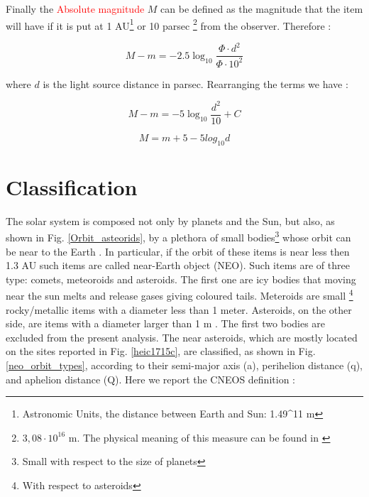 \documentclass[12pt,%
               a4paper,%
               oneside,openany,%
               titlepage,%
               headinclude,footinclude,%
               BCOR5mm,%
               cleardoublepage=empty,%
               tablecaptionabove,%
               floatperchapter,
               ]{scrreprt}                 %
\begin{document}
Finally the \textcolor{red}{Absolute magnitude} $M$ can be defined as the magnitude that the item will have if it is put at 1 AU\footnote{Astronomic Units, the distance between Earth and Sun: 1.49^{11} m} or 10 parsec \footnote{$3,08\cdot 10^{16}$ m. The physical meaning of this measure can be found in \cite{burbine2016asteroids}} from the observer. Therefore  \cite{burbine2016asteroids}:

\begin{equation}
M-m=-2.5\log_{10}\frac{\Phi\cdot d^{2} }{\Phi\cdot 10^{2}}
\end{equation}

where $d$ is the light source distance in parsec. Rearranging the terms we have \cite{burbine2016asteroids}:

\begin{equation}
M-m=-5\log_{10}\frac{ d^{2} }{10}+C
\end{equation}

\begin{equation}
M=m+5-5log_{10}d
\end{equation}



\section{Classification}

The solar system is composed not only by planets and the Sun, but also, as shown in Fig. \ref{Orbit_asteorids}, by a plethora of small bodies\footnote{Small with respect to the size of planets} whose orbit can be near to the Earth \cite{burbine2016asteroids}. In particular, if the orbit of these items is near less then 1.3 AU such items are called near-Earth object (NEO). Such items are of three type: comets, meteoroids and asteroids. The first one are icy bodies that moving near the sun melts and release gases giving coloured tails. Meteroids are small \footnote{With respect to asteroids} rocky/metallic items with a diameter less than 1 meter. Asteroids, on the other side, are items with a diameter larger than 1 m \cite{burbine2016asteroids}. The first two bodies are excluded from the present analysis. The near asteroids, which are mostly located on the sites reported in Fig. \ref{heic1715c}, are classified, as shown in Fig. \ref{neo_orbit_types}, according to their semi-major axis (a), perihelion distance (q), and aphelion distance (Q). Here we report the CNEOS definition \cite{nasa_classification}:
\end{document}
